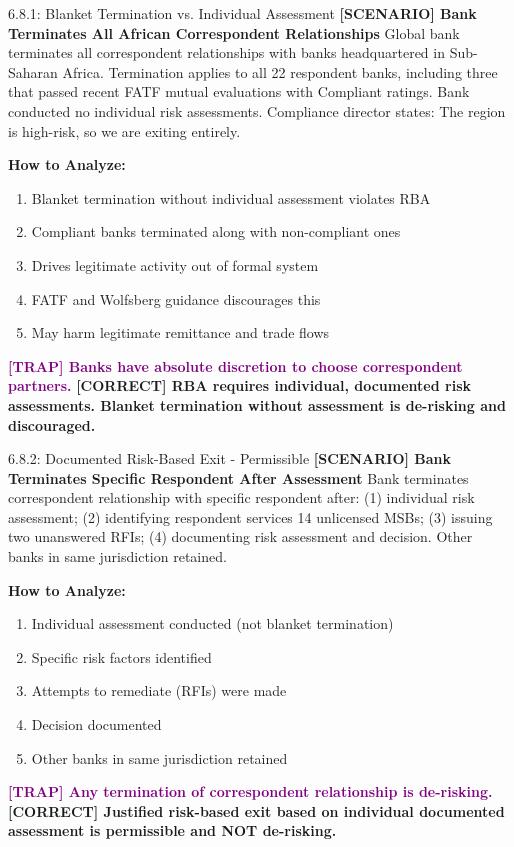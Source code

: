 \documentclass[11pt,a4paper]{beamer}
\newcommand{\trap}[1]{\textcolor{purple}{\textbf{[TRAP] #1}}}
\newcommand{\correct}[1]{\textcolor{green!50!black}{\textbf{[CORRECT] #1}}}
\newcommand{\scenario}[1]{\textcolor{blue!70!black}{\textbf{[SCENARIO] #1}}}
\begin{document}
\begin{frame}{6.8.1: Blanket Termination vs. Individual Assessment}
	\scenario{Bank Terminates All African Correspondent Relationships}
	Global bank terminates all correspondent relationships with banks headquartered in Sub-Saharan Africa. Termination applies to all 22 respondent banks, including three that passed recent FATF mutual evaluations with Compliant ratings. Bank conducted no individual risk assessments. Compliance director states: The region is high-risk, so we are exiting entirely.
	
	\vspace{0.1cm}
	\textbf{How to Analyze:}
	\begin{enumerate}
		\item Blanket termination without individual assessment violates RBA
		\item Compliant banks terminated along with non-compliant ones
		\item Drives legitimate activity out of formal system
		\item FATF and Wolfsberg guidance discourages this
		\item May harm legitimate remittance and trade flows
	\end{enumerate}
	\trap{Banks have absolute discretion to choose correspondent partners.}
	\correct{RBA requires individual, documented risk assessments. Blanket termination without assessment is de-risking and discouraged.}
\end{frame}

\begin{frame}{6.8.2: Documented Risk-Based Exit - Permissible}
	\scenario{Bank Terminates Specific Respondent After Assessment}
	Bank terminates correspondent relationship with specific respondent after: (1) individual risk assessment; (2) identifying respondent services 14 unlicensed MSBs; (3) issuing two unanswered RFIs; (4) documenting risk assessment and decision. Other banks in same jurisdiction retained.
	
	\vspace{0.1cm}
	\textbf{How to Analyze:}
	\begin{enumerate}
		\item Individual assessment conducted (not blanket termination)
		\item Specific risk factors identified
		\item Attempts to remediate (RFIs) were made
		\item Decision documented
		\item Other banks in same jurisdiction retained
	\end{enumerate}
	\trap{Any termination of correspondent relationship is de-risking.}
	\correct{Justified risk-based exit based on individual documented assessment is permissible and NOT de-risking.}
\end{frame}
\end{document}

